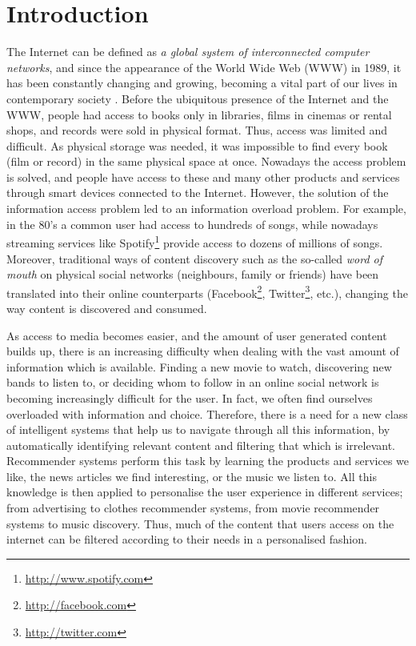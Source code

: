 
\chapter{Introduction}\label{ch:introduction} %


The Internet can be defined as  \emph{a global system of interconnected computer networks}, and  since the appearance of the World Wide Web (WWW) in 1989, it has been constantly changing and growing, becoming a vital part of our lives in  contemporary society \cite{Morris1996}.  Before the ubiquitous presence of the Internet and the WWW,  people had access to books only in libraries, films in cinemas or rental shops, and records were sold in physical format. Thus,  access was limited and difficult. As physical storage was needed, it was impossible to find every book (film or record) in the same physical space at once. Nowadays the access problem is solved, and people have access to these and many other products and services through smart devices connected to the Internet. However, the solution of the information access problem led to an information overload problem. For example, in the 80's a common user had access to hundreds of songs, while nowadays streaming services like Spotify\footnote{\url{http://www.spotify.com}} provide access to dozens of millions of songs.  Moreover, traditional ways of content discovery such as the so-called \emph{word of mouth} on physical social networks (neighbours, family or friends) have been translated into their online counterparts (Facebook\footnote{\url{http://facebook.com}}, Twitter\footnote{\url{http://twitter.com}}, etc.), changing the way content is discovered and consumed. 

As access to media becomes easier, and the amount of user generated content builds up, there is an increasing difficulty when dealing with the vast amount of information which is available. Finding a new movie to watch, discovering new bands to listen to, or deciding whom to follow in an online social network is becoming increasingly difficult for the user. In fact, we often find ourselves overloaded with information and choice. Therefore, there is a need for a new class of  intelligent systems that help us to navigate through all this information, by automatically identifying  relevant content and filtering  that which is irrelevant. Recommender systems \cite{Aman2010, Ricci2011, Levy2010a, Resnick1997, Schafer1999} perform this task by learning the products and services we like, the news articles we find interesting, or the music we listen to. All this knowledge is then applied to personalise the user experience in different services; from advertising to clothes recommender systems, from movie recommender systems to music discovery. Thus, much of the content that users access on the internet can be filtered according to their needs in a personalised fashion. 


